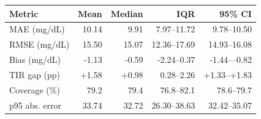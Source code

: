 \begin{tabular}{lrrrr}
\toprule
Metric & Mean & Median & IQR & 95\% CI \\
\midrule
MAE (mg/dL) & 10.14 & 9.91 & 7.97--11.72 & 9.78--10.50 \\
RMSE (mg/dL) & 15.50 & 15.07 & 12.36--17.69 & 14.93--16.08 \\
Bias (mg/dL) & -1.13 & -0.59 & -2.24--0.37 & -1.44---0.82 \\
TIR gap (pp) & +1.58 & +0.98 & 0.28--2.26 & +1.33--+1.83 \\
Coverage (\%) & 79.2 & 79.4 & 76.8--82.1 & 78.6--79.7 \\
p95 abs. error & 33.74 & 32.72 & 26.30--38.63 & 32.42--35.07 \\
\bottomrule
\end{tabular}
